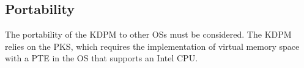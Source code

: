 


\subsection{Portability}
The portability of the KDPM to other OSs must be considered. The KDPM relies on
the PKS, which requires the implementation of virtual memory space with a PTE in
the OS that supports an Intel CPU.
%




